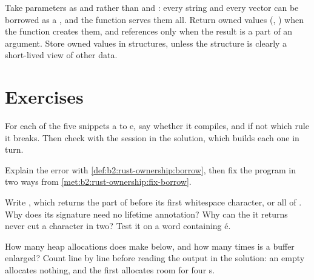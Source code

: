 \begin{inpractice}
Take parameters as  and \code{&[T]} rather than  and : every string and every
vector can be borrowed as a , and the function serves them all. Return owned values (,
) when the function creates them, and references only when the result is a part of an argument. Store
owned values in structures, unless the structure is clearly a short-lived view of other data.
\end{inpractice}

\section{Exercises}\label{sec:b2:rust-ownership:exercises}

\begin{exercise}[$\star$]\label{exo:b2:rust-ownership:1}
For each of the five snippets a to e, say whether it compiles, and if not which rule it breaks. Then check with the
session in the solution, which builds each one in turn.
\end{exercise}

\begin{exercise}[$\star$]\label{exo:b2:rust-ownership:2}
Explain the error with \cref{def:b2:rust-ownership:borrow}, then fix the program in two ways from
\cref{met:b2:rust-ownership:fix-borrow}.
\end{exercise}

\begin{exercise}[$\star$]\label{exo:b2:rust-ownership:3}
Write , which returns the part of  before its first whitespace
character, or all of . Why does its signature need no lifetime annotation? Why can the  it returns never
cut a character in two? Test it on a word containing é.
\end{exercise}

\begin{exercise}[$\star$]\label{exo:b2:rust-ownership:4}
How many heap allocations does  make below, and how many times is a buffer enlarged? Count line by line
before reading the output in the solution: an empty  allocates nothing, and the first  allocates
room for four s.
\end{exercise}

